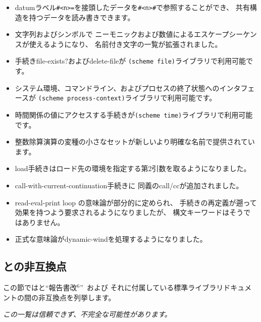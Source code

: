 \begin{itemize}
\item datumラベル{\tt \#<n>=}を接頭したデータを{\tt \#<n>\#}で参照することができ、
共有構造を持つデータを読み書きできます。

\item 文字列およびシンボルで
ニーモニックおよび数値によるエスケープシーケンスが使えるようになり、
名前付き文字の一覧が拡張されました。

\item 手続き{\cf file-exists?}および{\cf delete-file}が
{\tt (scheme file)}ライブラリで利用可能です。

\item システム環境、コマンドライン、およびプロセスの終了状態へのインタフェースが
{\tt (scheme process-\+context)}ライブラリで利用可能です。

\item 時間関係の値にアクセスする手続きが{\tt (scheme time)}ライブラリで利用可能です。

\item 整数除算演算の変種の小さなセットが新しいより明確な名前で提供されています。

\item {\cf load}手続きはロード先の環境を指定する第2引数を取るようになりました。

\item {\cf call-with-current-continuation}手続きに
同義の{\cf call/cc}が追加されました。

\item read-eval-print loop の意味論が部分的に定められ、
手続きの再定義が遡って効果を持つよう要求されるようになりましたが、
構文キーワードはそうではありません。

\item 正式な意味論が{\cf dynamic-wind}を処理するようになりました。
\end{itemize}

\subsection*{\rsixrs{}との非互換点}
この節では\rsevenrs{}と``報告書改$^6$''~\cite{R6RS}および
それに付属している標準ライブラリドキュメントの間の非互換点を列挙します。

{\em この一覧は信頼できず、不完全な可能性があります。}

